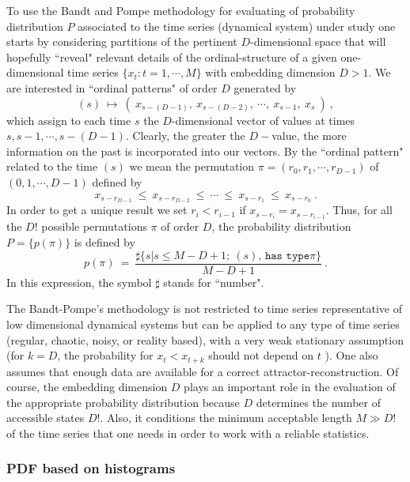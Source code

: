 \documentclass[conference]{IEEEtran}
\begin{document}
To use the Bandt and Pompe \cite{Pompe} methodology for evaluating
of probability distribution $P$ associated to the time series
(dynamical system) under study one starts by  considering
partitions of the pertinent $D$-dimensional space that will
hopefully ``reveal" relevant details of the ordinal-structure of a
given one-dimensional time series $ \{x_t : t=1, \cdots,M \}$ with
 embedding dimension $D > 1$. We are interested in ``ordinal
patterns" of order $D$ \cite{Pompe,Keller} generated by
\begin{equation}
(s)~\mapsto~
\left(~x_{s-(D-1)},~x_{s-(D-2)},~\cdots,~x_{s-1},~x_{s}~\right) \
, \label{vectores}
\end{equation}
which assign to each time $s$ the $D$-dimensional vector of values
at times $s, s-1,\cdots,s-(D-1)$. Clearly, the greater the
$D-$value, the more information on the past  is incorporated into
our vectors. By the ``ordinal pattern" related to the time $(s)$
we mean the permutation $\pi=(r_0,r_1, \cdots,r_{D-1})$ of
$(0,1,\cdots,D-1)$ defined by
\begin{equation}
x_{s-r_{D-1}}~\le~x_{s-r_{D-2}}~\le~\cdots~\le~x_{s-r_{1}}~\le~x_{s-r_0}
\ . \label{permuta}
\end{equation}
In order to get a unique result we set $r_i <r_{i-1}$ if
$x_{s-r_{i}}=x_{s-r_{i-1}}$. Thus, for all the $D!$ possible
permutations $\pi$ of order $D$, the probability distribution
$P=\{p(\pi)\}$ is defined by
\begin{equation}
p(\pi)~=~\frac{\sharp \{s|s\leq M-D+1;~ (s) \texttt{, has type
}\pi\}}{M-D+1} \ . \label{frequ}
\end{equation}
In this expression, the symbol $\sharp$ stands for ``number".


The Bandt-Pompe's methodology is not restricted to time series
representative of low dimensional dynamical systems but can be
applied to any type of time series (regular, chaotic, noisy, or
reality based), with a very weak stationary assumption (for $k =
D$, the probability for $x_t < x_{t+k}$ should not depend on $t$
\cite{Pompe}). One also assumes that enough data are available for
a correct attractor-reconstruction. Of course, the embedding
dimension $D$ plays an important role in the evaluation of the
appropriate probability distribution because $D$ determines the
number of accessible states $D!$. Also, it conditions the minimum
acceptable length $M \gg D!$ of the time series that one needs in
order to work with a reliable statistics.

\subsubsection{PDF based on histograms}
\end{document}
